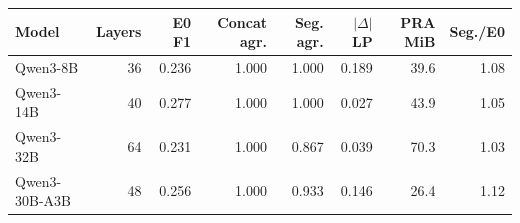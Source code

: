 \begin{tabular}{lrrrrrrr}
\toprule
Model & Layers & E0 F1 & Concat agr. & Seg. agr. & $|\Delta|$LP & PRA MiB & Seg./E0 \\
\midrule
Qwen3-8B & 36 & 0.236 & 1.000 & 1.000 & 0.189 & 39.6 & 1.08 \\
Qwen3-14B & 40 & 0.277 & 1.000 & 1.000 & 0.027 & 43.9 & 1.05 \\
Qwen3-32B & 64 & 0.231 & 1.000 & 0.867 & 0.039 & 70.3 & 1.03 \\
Qwen3-30B-A3B & 48 & 0.256 & 1.000 & 0.933 & 0.146 & 26.4 & 1.12 \\
\bottomrule
\end{tabular}
